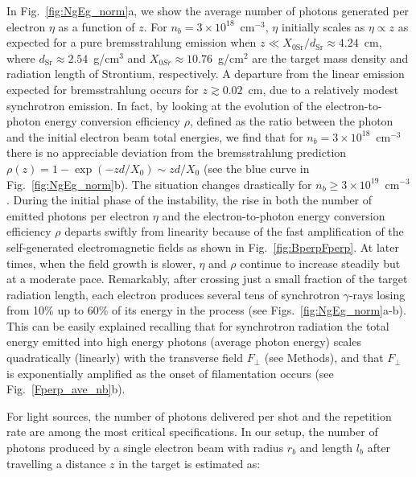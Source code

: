 \documentclass[fleqn,11pt]{wlscirep}
\begin{document}
In Fig.~\ref{fig:NgEg_norm}a, we show the average number of photons generated per electron $\eta$ as a function of $z$. 
For $n_b=3\times10^{18}$~cm$^{-3}$, $\eta$ initially scales as $\eta\propto z$ as expected for a pure bremsstrahlung emission when $z \ll X_\text{0Sr}/d_\text{Sr}\approx4.24$~cm, where $d_\text{Sr}\approx2.54$~g/cm$^{3}$ and $X_{0Sr}\approx10.76$~g/cm$^2$ are the target mass density and radiation length of Strontium, respectively. A departure from the linear emission expected for bremsstrahlung occurs for $z \gtrsim 0.02$~cm, due to a relatively modest synchrotron emission. 
In fact, by looking at the evolution of the electron-to-photon energy conversion efficiency $\rho$, defined as the ratio between the photon and the initial electron beam total energies, we find that for $n_b=3\times10^{18}$~cm$^{-3}$ there is no appreciable deviation from the bremsstrahlung prediction\cite{RevModPhys.46.815,SegreNucleiParticles} $\rho(z)=1-\exp(-zd/X_0)\sim zd/X_0$ (see the blue curve in Fig.~\ref{fig:NgEg_norm}b). 
The situation changes drastically for $n_b\geq3\times10^{19}$~cm$^{-3}$. 
During the initial phase of the instability, the rise in both the number of emitted photons per electron $\eta$ and the electron-to-photon energy conversion efficiency $\rho$ departs swiftly from linearity because of the fast amplification of the self-generated electromagnetic fields as shown in Fig.~\ref{fig:BperpFperp}. 
At later times, when the field growth is slower, $\eta$ and $\rho$ continue to increase steadily but at a moderate pace. 
Remarkably, after crossing just a small fraction of the target radiation length, each electron produces several tens of synchrotron $\gamma$-rays losing from 10\% up to 60\% of its energy in the process (see Figs.~\ref{fig:NgEg_norm}a-b). 
This can be easily explained recalling that for synchrotron radiation the total energy emitted into high energy photons (average photon energy) scales quadratically (linearly) with the transverse field $F_\perp$ (see Methods), and that $F_\perp$ is exponentially amplified as the onset of filamentation occurs (see Fig.~\ref{Fperp_ave_nb}b).

For light sources, the number of photons delivered per shot and the repetition rate are among the most critical specifications. 
In our setup, the number of photons produced by a single electron beam with radius $r_b$ and length $l_b$ after travelling a distance $z$ in the target is estimated as:
\end{document}
